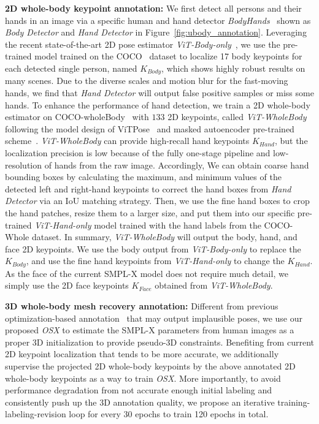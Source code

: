 \documentclass[10pt,twocolumn,letterpaper]{article}
\newcommand{\modelname}{\emph{OSX}\xspace}
\begin{document}
\noindent \textbf{2D whole-body keypoint annotation:} 
We first detect all persons and their hands in an image via a specific human and hand detector \emph{BodyHands}~\cite{narasimhaswamy2022bodyhands} shown as \emph{Body Detector} and \emph{Hand Detector} in Figure~\ref{fig:ubody_annotation}.
Leveraging the recent state-of-the-art 2D pose estimator \emph{ViT-Body-only}~\cite{YufeiXu2022ViTPoseSV}, we use the pre-trained model trained on the COCO~\cite{lin2014coco} dataset to localize 17 body keypoints for each detected single person, named \emph{$K_{Body}$}, which shows highly robust results on many scenes.
Due to the diverse scales and motion blur for the fast-moving hands, we find that \emph{Hand Detector} will output false positive samples or miss some hands. To enhance the performance of hand detection, 
we train a 2D whole-body estimator on COCO-wholeBody~\cite{jin2020wholebody} with $133$ 2D keypoints, called \emph{ViT-WholeBody} following the model design of ViTPose~\cite{YufeiXu2022ViTPoseSV} and masked autoencoder pre-trained scheme~\cite{he2022masked}. \emph{ViT-WholeBody} can provide high-recall hand keypoints \emph{$K_{Hand}$}, but the localization precision is low because of the fully one-stage pipeline and low-resolution of hands from the raw image. Accordingly, We can obtain coarse hand bounding boxes by calculating the maximum, and minimum values of the detected left and right-hand keypoints to correct the hand boxes from \emph{Hand Detector} via an IoU matching strategy.
Then, we use the fine hand boxes to crop the hand patches, resize them to a larger size, and put them into our specific pre-trained \emph{ViT-Hand-only} model trained with the hand labels from the COCO-Whole dataset.
In summary, \emph{ViT-WholeBody} will output the body, hand, and face 2D keypoints. We use the body output from \emph{ViT-Body-only} to replace the \emph{$K_{Body}$}, and use the fine hand keypoints from \emph{ViT-Hand-only} to change the \emph{$K_{Hand}$}.
As the face of the current SMPL-X model does not require much detail, we simply use the 2D face keypoints \emph{$K_{Face}$} obtained from \emph{ViT-WholeBody}.


\noindent\textbf{3D whole-body mesh recovery annotation:} 
Different from previous optimization-based annotation~\cite{Pavlakos_2019smplx} that may output implausible poses, we use our proposed \modelname to estimate the SMPL-X parameters from human images as a proper 3D initialization to provide pseudo-3D constraints.
Benefiting from current 2D keypoint localization that tends to be more accurate, we additionally supervise the projected 2D whole-body keypoints by the above annotated 2D whole-body keypoints as a way to train \modelname.
More importantly, to avoid performance degradation from not accurate enough initial labeling and consistently push up the 3D annotation quality, we propose an iterative training-labeling-revision loop for every 30 epochs to train 120 epochs in total. 
\end{document}
